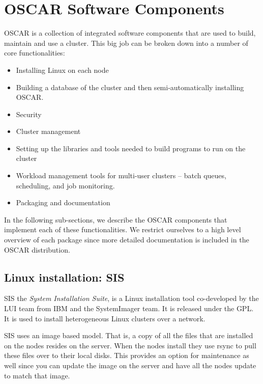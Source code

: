 \documentclass[letterpaper,11pt]{article}
\begin{document}
\section{OSCAR Software Components}
OSCAR is a collection of integrated software components that are used
to build, maintain and use a cluster.  This big job can be broken down
into a number of core functionalities:

\begin{itemize}
        \item Installing Linux on each node

        \item Building a database of the cluster and then
        semi-automatically installing OSCAR.

        \item Security

        \item Cluster management

        \item Setting up the libraries and tools needed to build programs
        to run on the cluster

        \item Workload management tools for multi-user clusters -- batch
        queues, scheduling, and job monitoring.

        \item Packaging and documentation
\end{itemize}

In the following sub-sections, we describe the OSCAR components that
implement each of these functionalities.  We restrict ourselves to a
high level overview of each package since more detailed documentation
is included in the OSCAR distribution.


\subsection{Linux installation: SIS}
SIS \cite{SIS} the \emph{System Installation Suite}, is a
Linux installation tool co-developed by the LUI team from IBM and 
the SystemImager\cite{SI}  team. It is released under the GPL.
It is used to install heterogeneous Linux clusters over a network.

SIS uses an image based model. That is, a copy of all the files that
are installed on the nodes resides on the server. When the nodes install
they use rsync to pull these files over to their local disks. This provides
an option for maintenance as well since you can update the image on the server
and have all the nodes update to match that image.
\end{document}
